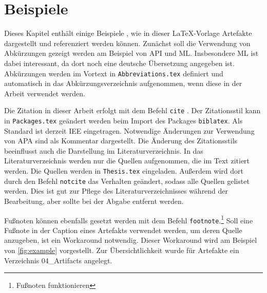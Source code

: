 %
%
\chapter{Beispiele}

Dieses Kapitel enthält einige Beispiele , wie in dieser \LaTeX-Vorlage Artefakte dargestellt und referenziert werden können.
Zunächst soll die Verwendung von Abkürzungen gezeigt werden am Beispiel von \ac{API} und \ac{ML}.
Insbesondere \ac{ML} ist dabei interessant, da dort noch eine deutsche Übersetzung angegeben ist. Abkürzungen werden im Vortext in \texttt{Abbreviations.tex} definiert und automatisch in das Abkürzungsverzeichnis aufgenommen, wenn diese in der Arbeit verwendet werden.

Die Zitation in dieser Arbeit erfolgt mit dem Befehl \texttt{cite} \cite[S. 0]{ertelIntroductionArtificialIntelligence2017}.
Der Zitationsstil kann in \texttt{Packages.tex} geändert werden beim Import des Packages \texttt{biblatex}.
Als Standard ist derzeit IEE eingetragen. 
Notwendige Änderungen zur Verwendung von APA sind als Kommentar dargestellt.
Die Änderung des Zitationsstils beeinflusst auch die Darstellung im Literaturverzeichnis.
In das Literaturverzeichnis werden nur die Quellen aufgenommen, die im Text zitiert werden.
Die Quellen werden in \texttt{Thesis.tex} eingeladen.
Außerdem wird dort durch den Befehl \texttt{notcite} das Verhalten geändert, sodass alle Quellen gelistet werden.
Dies ist gut zur Pflege des Literaturverzeichnisses während der Bearbeitung, aber sollte bei der Abgabe entfernt werden.

Fußnoten können ebenfalls gesetzt werden mit dem Befehl \texttt{footnote}.\footnote{Fußnoten funktionieren}
Soll eine Fußnote in der Caption eines Artefakts verwendet werden, um deren Quelle anzugeben, ist ein Workaround notwendig.
Dieser Workaround wird am Beispiel von \cref{fig:example} vorgestellt. Zur Übersichtlichkeit wurde für Artefakte ein Verzeichnis 04\_Artifacts angelegt.

